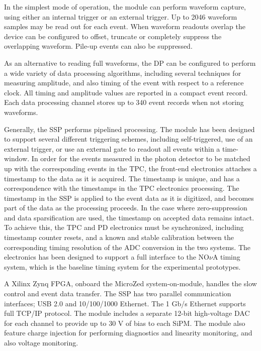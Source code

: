 In the simplest mode of operation, the module can perform waveform
capture, using either an internal trigger or an external trigger.  Up
to 2046 waveform samples may be read out for each event.  When
waveform readouts overlap the device can be configured to offset,
truncate or completely suppress the overlapping waveform.  Pile-up
events can also be suppressed.

As an alternative to reading full waveforms, the DP can be configured
to perform a wide variety of data processing algorithms, including
several techniques for measuring amplitude, and also timing of the
event with respect to a reference clock.  All timing and amplitude
values are reported in a compact event record.  Each data processing
channel stores up to 340 event records when not storing waveforms.

Generally, the SSP performs pipelined processing.  The module has been
designed to support several different triggering schemes, including
self-triggered, use of an external trigger, or use an external gate to
readout all events within a time-window.  In order for the events
measured in the photon detector to be matched up with the
corresponding events in the TPC, the front-end electronics attaches a
timestamp to the data as it is acquired.  The timestamp is unique, and
has a correspondence with the timestamps in the TPC electronics
processing.  The timestamp in the SSP is applied to the event data as
it is digitized, and becomes part of the data as the processing
proceeds.  In the case where zero-suppression and data sparsification
are used, the timestamp on accepted data remains intact.  To achieve
this, the TPC and PD electronics must be synchronized, including
timestamp counter resets, and a known and stable calibration between
the corresponding timing resolution of the ADC conversion in the two
systems.  The electronics has been designed to support a full
interface to the NO$\nu$A timing system, which is the baseline timing
system for the experimental prototypes.

A Xilinx Zynq FPGA, onboard the MicroZed system-on-module, handles the
slow control and event data transfer.  The SSP has two parallel
communication interfaces; USB 2.0 and 10/100/1000 Ethernet.  The 1
Gb/s Ethernet supports full TCP/IP protocol.  The module includes a
separate 12-bit high-voltage DAC for each channel to provide up to 30
V of bias to each SiPM.  The module also feature charge injection for
performing diagnostics and linearity monitoring, and also voltage
monitoring.

